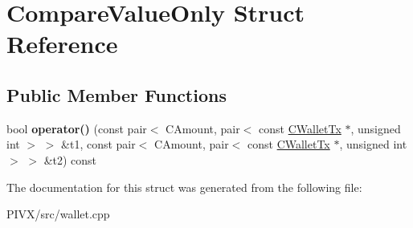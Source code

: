 \hypertarget{struct_compare_value_only}{}\section{Compare\+Value\+Only Struct Reference}
\label{struct_compare_value_only}
\subsection*{Public Member Functions}
\begin{DoxyCompactItemize}
\item 
\mbox{\label{struct_compare_value_only_a423bf5200199a41849aabb4b6ae46d94}} 
bool {\bfseries operator()} (const pair$<$ C\+Amount, pair$<$ const \mbox{\hyperlink{class_c_wallet_tx}{C\+Wallet\+Tx}} $\ast$, unsigned int $>$ $>$ \&t1, const pair$<$ C\+Amount, pair$<$ const \mbox{\hyperlink{class_c_wallet_tx}{C\+Wallet\+Tx}} $\ast$, unsigned int $>$ $>$ \&t2) const
\end{DoxyCompactItemize}


The documentation for this struct was generated from the following file\+:\begin{DoxyCompactItemize}
\item 
P\+I\+V\+X/src/wallet.\+cpp\end{DoxyCompactItemize}
